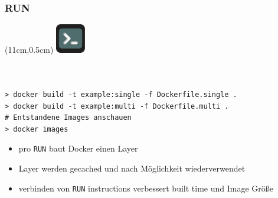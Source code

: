 \documentclass[22pt]{beamer}
\newcommand{\code}[1]{\colorbox{gray!10}{\texttt{#1}}}
\newcommand{\terminal}{
    \begin{textblock*}{1.3cm}(11cm,0.5cm) %
    \includegraphics[width=1.3cm]{Bilder/terminal2.png}
    \end{textblock*}
}
\begin{document}
\begin{frame}[fragile]
    \frametitle{RUN}
    \terminal
    \begin{columns}
        \begin{column}{0.5\textwidth}
            \inputminted[fontsize=\scriptsize, frame=lines]{dockerfile}{../examples/Dockerfile.single}
        \end{column}
        \begin{column}{0.5\textwidth}  %
            \inputminted[fontsize=\scriptsize, frame=lines]{dockerfile}{../examples/Dockerfile.multi}
        \end{column}
    \end{columns}
    \medskip
\begin{verbatim}
> docker build -t example:single -f Dockerfile.single .
> docker build -t example:multi -f Dockerfile.multi .
# Entstandene Images anschauen
> docker images
\end{verbatim}
    \pause\medskip
    \begin{itemize}
        \item pro \code{RUN} baut Docker einen Layer
        \item Layer werden gecached und nach Möglichkeit wiederverwendet
        \item verbinden von \code{RUN} instructions verbessert built time und Image Größe
    \end{itemize}
\end{frame}
\end{document}
